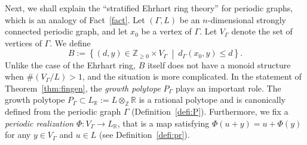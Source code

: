 Next, we shall explain the ``stratified Ehrhart ring theory'' for periodic graphs, which is an analogy of Fact~\ref{fact}. 
Let $(\Gamma, L)$ be an $n$-dimensional strongly connected periodic graph, and let $x_0$ be a vertex of $\Gamma$. 
Let $V_{\Gamma}$ denote the set of vertices of $\Gamma$. 
We define 
\[
B := \left \{ (d,y) \in \mathbb{Z}_{\ge 0} \times V_{\Gamma}  \ \middle | \ d_{\Gamma}(x_0, y) \le d \right\}. 
\]
Unlike the case of the Ehrhart ring, $B$ itself does not have a monoid structure when $\# (V_{\Gamma} /L) > 1$, and the situation is more complicated. 
In the statement of Theorem~\ref{thm:fingen}, the \textit{growth polytope} $P_{\Gamma}$ plays an important role. 
The growth polytope $P_{\Gamma} \subset L_{\mathbb{R}} := L \otimes _{\mathbb{Z}} \mathbb{R}$ is a rational polytope and is canonically defined from the periodic graph $\Gamma$ (Definition~\ref{defi:P}). 
Furthermore, we fix a \textit{periodic realization} $\Phi : V_{\Gamma} \to L_{\mathbb{R}}$, that is a map satisfying $\Phi (u + y) = u + \Phi(y)$ for any $y \in V_{\Gamma}$ and $u \in L$ (see Definition~\ref{defi:pr}). 


